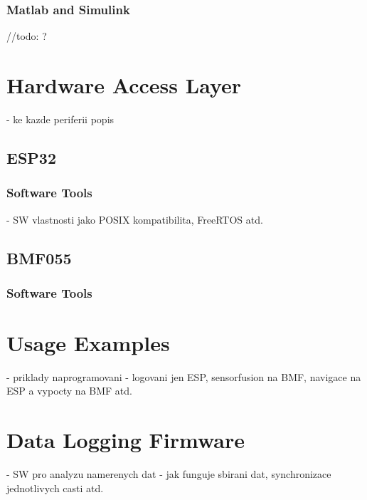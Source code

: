 \subsubsection{Matlab and Simulink}
//todo: ?

\section{Hardware Access Layer}
- ke kazde periferii popis

\subsection{ESP32}

\subsubsection{Software Tools}
- SW vlastnosti jako POSIX kompatibilita, FreeRTOS atd.

\subsection{BMF055}

\subsubsection{Software Tools}

\section{Usage Examples}
- priklady naprogramovani - logovani jen ESP, sensorfusion na BMF, navigace na ESP a vypocty na BMF atd.

\section{Data Logging Firmware}
- SW pro analyzu namerenych dat
- jak funguje sbirani dat, synchronizace jednotlivych casti atd.
